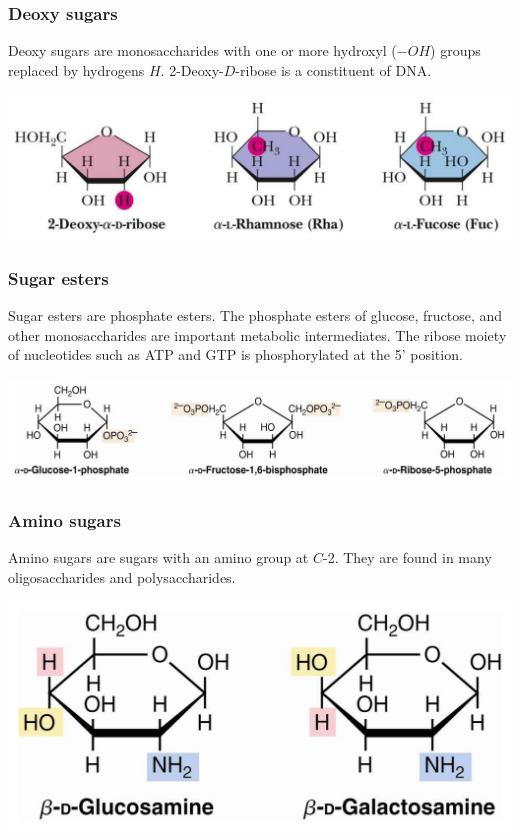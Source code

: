\documentclass[11pt]{article}
\begin{document}
\newpage

\subsubsection{Deoxy sugars}
\label{sec:orgef0e786}
Deoxy sugars are monosaccharides with one or more hydroxyl (\(-OH\)) groups replaced by hydrogens \(H\). 2-Deoxy-\(D\)-ribose is a constituent of DNA.
\begin{center}
\includegraphics[width=.9\linewidth]{./images/deoxy-sugars.png}
\end{center}

\subsubsection{Sugar esters}
\label{sec:orgdb5064c}
Sugar esters are phosphate esters. The phosphate esters of glucose, fructose, and other monosaccharides are important metabolic intermediates. The ribose moiety of nucleotides such as ATP and GTP is phosphorylated at the 5' position.
\begin{center}
\includegraphics[width=.9\linewidth]{./images/sugar-esters.png}
\end{center}

\subsubsection{Amino sugars}
\label{sec:orgce037ce}
Amino sugars are sugars with an amino group at \(C\)-2. They are found in many oligosaccharides and polysaccharides.
\begin{center}
\includegraphics[width=.9\linewidth]{./images/amino-sugars.png}
\end{center}
\end{document}
